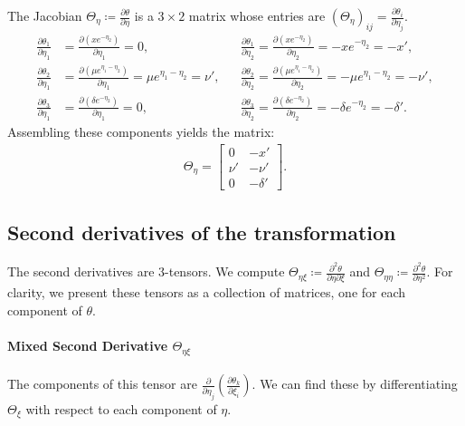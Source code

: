 \documentclass{article}
\begin{document}
The Jacobian $\Theta_\eta \coloneqq \frac{\partial \theta}{\partial \eta}$ is a $3 \times 2$ matrix whose entries are $(\Theta_\eta)_{ij} = \frac{\partial \theta_i}{\partial \eta_j}$.
%
\begin{align}
  \frac{\partial \theta_1}{\partial \eta_1} & = \frac{\partial (x e^{-\eta_2})}{\partial \eta_1} = 0,                                        &  & \frac{\partial \theta_1}{\partial \eta_2} = \frac{\partial (x e^{-\eta_2})}{\partial \eta_2} = -x e^{-\eta_2} = -x',                       \\
  \frac{\partial \theta_2}{\partial \eta_1} & = \frac{\partial (\mu e^{\eta_1 - \eta_2})}{\partial \eta_1} = \mu e^{\eta_1 - \eta_2} = \nu', &  & \frac{\partial \theta_2}{\partial \eta_2} = \frac{\partial (\mu e^{\eta_1 - \eta_2})}{\partial \eta_2} = -\mu e^{\eta_1 - \eta_2} = -\nu', \\
  \frac{\partial \theta_3}{\partial \eta_1} & = \frac{\partial (\delta e^{-\eta_2})}{\partial \eta_1} = 0,                                   &  & \frac{\partial \theta_3}{\partial \eta_2} = \frac{\partial (\delta e^{-\eta_2})}{\partial \eta_2} = -\delta e^{-\eta_2} = -\delta'.
\end{align}
%
Assembling these components yields the matrix:
%
\begin{align}
  \Theta_{\eta} =
  \begin{bmatrix}
    0    & -x'      \\
    \nu' & -\nu'    \\
    0    & -\delta'
  \end{bmatrix}.
\end{align}

\subsection{Second derivatives of the transformation}

The second derivatives are 3-tensors.
We compute $\Theta_{\eta\xi} \coloneqq \frac{\partial^2 \theta}{\partial \eta \partial \xi}$ and $\Theta_{\eta\eta} \coloneqq \frac{\partial^2 \theta}{\partial \eta^2}$.
For clarity, we present these tensors as a collection of matrices, one for each component of $\theta$.

\paragraph{Mixed Second Derivative $\Theta_{\eta\xi}$}

The components of this tensor are $\frac{\partial}{\partial \eta_j} \left( \frac{\partial \theta_k}{\partial \xi_i} \right)$.
We can find these by differentiating $\Theta_\xi$ with respect to each component of $\eta$.
\end{document}

